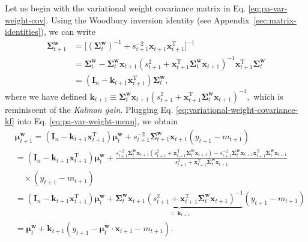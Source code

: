 Let us begin with the variational weight covariance matrix in Eq. \eqref{eq:pa-var-weight-cov}. Using the Woodbury inversion identity (see Appendix~\ref{sec:matrix-identities}), we can write
\begin{align}
\label{eq:variational-weight-covariance-kf}
	\boldsymbol{\Sigma}_{t+1}^\mathbf{w}
	&= \big[(\boldsymbol{\Sigma}_{t}^\mathbf{w})^{-1} + s_{t+1}^{-2}\mathbf{x}_{t+1}\mathbf{x}_{t+1}^\text{T}\big]^{-1}
	\nonumber \\	
	&= \boldsymbol{\Sigma}_{t}^\mathbf{w} - \boldsymbol{\Sigma}_{t}^\mathbf{w}\mathbf{x}_{t+1}(s_{t+1}^2 + \mathbf{x}_{t+1}^\text{T}\boldsymbol{\Sigma}_{t}^\mathbf{w}\mathbf{x}_{t+1})^{-1}\mathbf{x}_{t+1}^\text{T}\boldsymbol{\Sigma}_{t}^\mathbf{w}
	\nonumber \\
	&= (\mathbf{I}_n - \mathbf{k}_{t+1}\mathbf{x}_{t+1}^\text{T})\boldsymbol{\Sigma}_{t}^\mathbf{w},
\end{align}
where we have defined
$
	\mathbf{k}_{t+1}
	\equiv \boldsymbol{\Sigma}_{t}^\mathbf{w}\mathbf{x}_{t+1}(s_{t+1}^2 + \mathbf{x}_{t+1}^\text{T}\boldsymbol{\Sigma}_{t}^\mathbf{w}\mathbf{x}_{t+1})^{-1},
$
which is reminiscent of the \emph{Kalman gain}. Plugging Eq. \eqref{eq:variational-weight-covariance-kf} into Eq. \eqref{eq:pa-var-weight-mean}, we obtain
\begin{align}
\label{eq:variational-weight-mean-kf}
	& \boldsymbol{\mu}_{t+1}^\mathbf{w}
	= (\mathbf{I}_n - \mathbf{k}_{t+1}\mathbf{x}_{t+1}^\text{T})\boldsymbol{\mu}_{t}^\mathbf{w}
	+ s_{t+1}^{-2}\boldsymbol{\Sigma}_{t+1}^\mathbf{w}\mathbf{x}_{t+1}(y_{t+1} - m_{t+1})
	\nonumber \\
	&= (\mathbf{I}_n - \mathbf{k}_{t+1}\mathbf{x}_{t+1}^\text{T})\boldsymbol{\mu}_{t}^\mathbf{w}
	+ \frac{s_{t+1}^{-2}\boldsymbol{\Sigma}_{t}^\mathbf{w}\mathbf{x}_{t+1}(s_{t+1}^2 + \mathbf{x}_{t+1}^\text{T}\boldsymbol{\Sigma}_{t}^\mathbf{w}\mathbf{x}_{t+1}) - s_{t+1}^{-2}\boldsymbol{\Sigma}_{t}^\mathbf{w}\mathbf{x}_{t+1}\mathbf{x}_{t+1}^\text{T}\boldsymbol{\Sigma}_{t}^\mathbf{w}\mathbf{x}_{t+1}}{s_{t+1}^2 + \mathbf{x}_{t+1}^\text{T}\boldsymbol{\Sigma}_{t}^\mathbf{w}\mathbf{x}_{t+1}}
	\nonumber \\
	& \quad \times (y_{t+1} - m_{t+1})
	\nonumber \\
	&= (\mathbf{I}_n - \mathbf{k}_{t+1}\mathbf{x}_{t+1}^\text{T})\boldsymbol{\mu}_{t}^\mathbf{w}
	+ \underbrace{\boldsymbol{\Sigma}_{t}^\mathbf{w}\mathbf{x}_{t+1}(s_{t+1}^2 + \mathbf{x}_{t+1}^\text{T}\boldsymbol{\Sigma}_{t}^\mathbf{w}\mathbf{x}_{t+1})^{-1}}_{=\,\mathbf{k}_{t+1}}(y_{t+1} - m_{t+1})
	\nonumber \\
	&= \boldsymbol{\mu}_{t}^\mathbf{w}
	+ \mathbf{k}_{t+1}(y_{t+1} - \boldsymbol{\mu}_{t}^\mathbf{w}\cdot\mathbf{x}_{t+1} - m_{t+1}).
\end{align}

